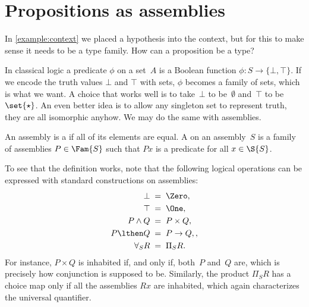 \section{Propositions as assemblies}
\label{sec:prop-as-assemblies}

In \cref{example:context} we placed a hypothesis into the context, but for this to make sense it needs to be a type family. How can a proposition be a type?

In classical logic a predicate $\phi$ on a set~$A$ is a Boolean function $\phi : S \to \{\bot, \top\}$. If we encode the truth values $\bot$ and $\top$ with sets, $\phi$ becomes a family of sets, which is what we want. A choice that works well is to take~$\bot$ to be~$\emptyset$ and~$\top$ to be~$\set{\star}$. An even better idea is to allow any singleton set to represent truth, they are all isomorphic anyhow. We may do the same with assemblies.

\begin{definition}
  An assembly is a  if all of its elements are equal.
  A  on an assembly~$S$ is a family of assemblies $P \in \Fam{S}$ such that $P x$ is a predicate for all $x \in \S{S}$.
\end{definition}

To see that the definition works, note that the following logical operations can be expressed with standard constructions on assemblies:
%
\begin{equation}
  \label{eq:prop-as-type-negative}
  \begin{aligned}
    \bot &\;=\; \Zero, \\
    \top &\;=\; \One, \\
    P \land Q &\;=\; P \times Q, \\
    P \lthen Q &\;=\; P \to Q,, \\
    \forall_S R &\;=\; \Pi_S R.
  \end{aligned}
\end{equation}
%
For instance, $P \times Q$ is inhabited if, and only if, both~$P$ and~$Q$ are, which is precisely how conjunction is supposed to be.
%
Similarly, the product $\Pi_S R$ has a choice map only if all the assemblies $R x$ are inhabited, which again characterizes the universal quantifier.

